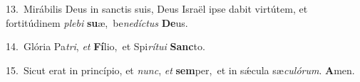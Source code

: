 {\numbfont\textcolor{\numbcolor}{13.}}~Mirábilis Deus in sanctis suis, Deus Israël ipse dabit virtútem, et fortitúdinem \textit{ple}\-\textit{bi} \textbf{su}\-æ,~\star be\-\textit{ne}\-\textit{díc}\textit{tus} \textbf{De}\-us.\par
{\numbfont\textcolor{\numbcolor}{14.}}~Glória Pa\-\textit{tri}\-, \textit{et} \textbf{Fí}\-lio,~\star et Spi\-\textit{rí}\-\textit{tu}\textit{i} \textbf{Sanc}\-to.\par
{\numbfont\textcolor{\numbcolor}{15.}}~Sicut erat in princípio, et \textit{nunc}\-, \textit{et} \textbf{sem}\-per,~\star et in sǽcula sæ\-\textit{cu}\-\textit{ló}\textit{rum}. \textbf{A}\-men.\par

